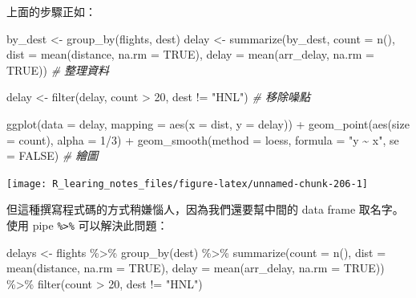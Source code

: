 \documentclass[
]{book}
\newenvironment{Shaded}{\begin{snugshade}}{\end{snugshade}}
\newcommand{\AttributeTok}[1]{\textcolor[rgb]{0.77,0.63,0.00}{#1}}
\newcommand{\CommentTok}[1]{\textcolor[rgb]{0.56,0.35,0.01}{\textit{#1}}}
\newcommand{\ConstantTok}[1]{\textcolor[rgb]{0.00,0.00,0.00}{#1}}
\newcommand{\DecValTok}[1]{\textcolor[rgb]{0.00,0.00,0.81}{#1}}
\newcommand{\FunctionTok}[1]{\textcolor[rgb]{0.00,0.00,0.00}{#1}}
\newcommand{\NormalTok}[1]{#1}
\newcommand{\OtherTok}[1]{\textcolor[rgb]{0.56,0.35,0.01}{#1}}
\newcommand{\SpecialCharTok}[1]{\textcolor[rgb]{0.00,0.00,0.00}{#1}}
\newcommand{\StringTok}[1]{\textcolor[rgb]{0.31,0.60,0.02}{#1}}
\theoremstyle{definition}
\theoremstyle{remark}
\begin{document}
上面的步驟正如：

\begin{Shaded}
\begin{Highlighting}[]
\NormalTok{by\_dest }\OtherTok{\textless{}{-}} \FunctionTok{group\_by}\NormalTok{(flights, dest)}
\NormalTok{delay }\OtherTok{\textless{}{-}} \FunctionTok{summarize}\NormalTok{(by\_dest, }\AttributeTok{count =} \FunctionTok{n}\NormalTok{(), }\AttributeTok{dist =} \FunctionTok{mean}\NormalTok{(distance, }\AttributeTok{na.rm =} \ConstantTok{TRUE}\NormalTok{),}
                   \AttributeTok{delay =} \FunctionTok{mean}\NormalTok{(arr\_delay, }\AttributeTok{na.rm =} \ConstantTok{TRUE}\NormalTok{))  }\CommentTok{\# 整理資料}

\NormalTok{delay }\OtherTok{\textless{}{-}} \FunctionTok{filter}\NormalTok{(delay, count }\SpecialCharTok{\textgreater{}} \DecValTok{20}\NormalTok{, dest }\SpecialCharTok{!=} \StringTok{"HNL"}\NormalTok{)  }\CommentTok{\# 移除噪點}

\FunctionTok{ggplot}\NormalTok{(}\AttributeTok{data =}\NormalTok{ delay, }\AttributeTok{mapping =} \FunctionTok{aes}\NormalTok{(}\AttributeTok{x =}\NormalTok{ dist, }\AttributeTok{y =}\NormalTok{ delay)) }\SpecialCharTok{+}
  \FunctionTok{geom\_point}\NormalTok{(}\FunctionTok{aes}\NormalTok{(}\AttributeTok{size =}\NormalTok{ count), }\AttributeTok{alpha =} \DecValTok{1}\SpecialCharTok{/}\DecValTok{3}\NormalTok{) }\SpecialCharTok{+}
  \FunctionTok{geom\_smooth}\NormalTok{(}\AttributeTok{method =} \StringTok{\textquotesingle{}loess\textquotesingle{}}\NormalTok{, }\AttributeTok{formula =} \StringTok{"y \textasciitilde{} x"}\NormalTok{, }\AttributeTok{se =} \ConstantTok{FALSE}\NormalTok{)  }\CommentTok{\# 繪圖}
\end{Highlighting}
\end{Shaded}

\begin{center}\texttt{[image: R\_learing\_notes\_files/figure-latex/unnamed-chunk-206-1]} \end{center}

但這種撰寫程式碼的方式稍嫌惱人，因為我們還要幫中間的 data frame 取名字。使用 pipe \texttt{\%\textgreater{}\%} 可以解決此問題：

\begin{Shaded}
\begin{Highlighting}[]
\NormalTok{delays }\OtherTok{\textless{}{-}}\NormalTok{ flights }\SpecialCharTok{\%\textgreater{}\%}
  \FunctionTok{group\_by}\NormalTok{(dest) }\SpecialCharTok{\%\textgreater{}\%}
  \FunctionTok{summarize}\NormalTok{(}\AttributeTok{count =} \FunctionTok{n}\NormalTok{(),}
            \AttributeTok{dist =} \FunctionTok{mean}\NormalTok{(distance, }\AttributeTok{na.rm =} \ConstantTok{TRUE}\NormalTok{),}
            \AttributeTok{delay =} \FunctionTok{mean}\NormalTok{(arr\_delay, }\AttributeTok{na.rm =} \ConstantTok{TRUE}\NormalTok{)) }\SpecialCharTok{\%\textgreater{}\%}
  \FunctionTok{filter}\NormalTok{(count }\SpecialCharTok{\textgreater{}} \DecValTok{20}\NormalTok{, dest }\SpecialCharTok{!=} \StringTok{"HNL"}\NormalTok{)}
\end{Highlighting}
\end{Shaded}
\end{document}
